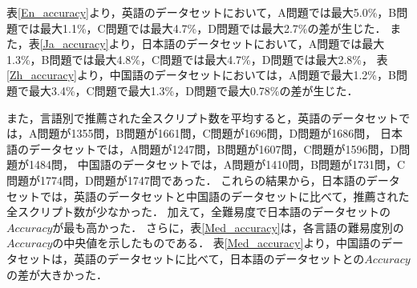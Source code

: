   表\ref{En_accuracy}より，英語のデータセットにおいて，A問題では最大5.0\%，B問題では最大1.1\%，C問題では最大4.7\%，D問題では最大2.7\%の差が生じた．
  また，表\ref{Ja_accuracy}より，日本語のデータセットにおいて，A問題では最大1.3\%，B問題では最大4.8\%，C問題では最大4.7\%，D問題では最大2.8\%，
  表\ref{Zh_accuracy}より，中国語のデータセットにおいては，A問題で最大1.2\%，B問題で最大3.4\%，C問題で最大1.3\%，D問題で最大0.78\%の差が生じた．

  また，言語別で推薦された全スクリプト数を平均すると，英語のデータセットでは，A問題が1355問，B問題が1661問，C問題が1696問，D問題が1686問，
  日本語のデータセットでは，A問題が1247問，B問題が1607問，C問題が1596問，D問題が1484問，
  中国語のデータセットでは，A問題が1410問，B問題が1731問，C問題が1774問，D問題が1747問であった．
  これらの結果から，日本語のデータセットでは，英語のデータセットと中国語のデータセットに比べて，推薦された全スクリプト数が少なかった．
  加えて，全難易度で日本語のデータセットの$Accuracy$が最も高かった．
  さらに，表\ref{Med_accuracy}は，各言語の難易度別の$Accuracy$の中央値を示したものである．   
  表\ref{Med_accuracy}より，中国語のデータセットは，英語のデータセットに比べて，日本語のデータセットとの$Accuracy$の差が大きかった．

      
      
